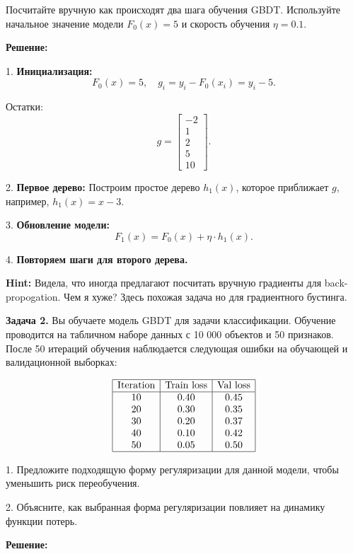 Посчитайте вручную как происходят два шага обучения GBDT. Используйте начальное значение модели \(F_0(x) = 5\) и скорость обучения \(\eta = 0.1\).

\textbf{Решение:}  

1. \textbf{Инициализация:}
   \[
   F_0(x) = 5, \quad g_i = y_i - F_0(x_i) = y_i - 5.
   \]

   Остатки:
   \[
   g = \begin{bmatrix} -2 \\ 1 \\ 2 \\ 5 \\ 10 \end{bmatrix}.
   \]

2. \textbf{Первое дерево:}  
   Построим простое дерево \(h_1(x)\), которое приближает \(g\), например, \(h_1(x) = x - 3\).  

3. \textbf{Обновление модели:}  
   \[
   F_1(x) = F_0(x) + \eta \cdot h_1(x).
   \]

4. \textbf{Повторяем шаги для второго дерева.}

\textbf{Hint:} 
Видела, что иногда предлагают посчитать вручную градиенты для back-propogation. Чем я хуже? Здесь похожая задача но для градиентного бустинга.

\vspace{1cm}

\textbf{Задача 2.}  
Вы обучаете модель GBDT для задачи классификации. Обучение проводится на табличном наборе данных с 10 000 объектов и 50 признаков. После 50 итераций обучения наблюдается следующая ошибки на обучающей и валидационной выборках:

\[
\begin{array}{|c|c|c|}
\hline
\text{Iteration} & \text{Train loss} & \text{Val loss} \\
\hline
10 & 0.40 & 0.45 \\
20 & 0.30 & 0.35 \\
30 & 0.20 & 0.37 \\
40 & 0.10 & 0.42 \\
50 & 0.05 & 0.50 \\
\hline
\end{array}
\]

1. Предложите подходящую форму регуляризации для данной модели, чтобы уменьшить риск переобучения.

2. Объясните, как выбранная форма регуляризации повлияет на динамику функции потерь.


\textbf{Решение:}

